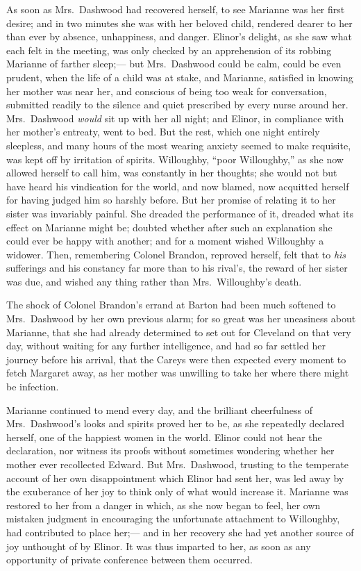 As soon as Mrs.\ Dashwood had recovered herself,
to see Marianne was her first desire; and in two minutes she
was with her beloved child, rendered dearer to her than ever
by absence, unhappiness, and danger.  Elinor's delight,
as she saw what each felt in the meeting, was only checked
by an apprehension of its robbing Marianne of farther sleep;---%
but Mrs.\ Dashwood could be calm, could be even prudent,
when the life of a child was at stake, and Marianne,
satisfied in knowing her mother was near her, and conscious
of being too weak for conversation, submitted readily to the
silence and quiet prescribed by every nurse around her.
Mrs.\ Dashwood \emph{would} sit up with her all night; and Elinor,
in compliance with her mother's entreaty, went to bed.
But the rest, which one night entirely sleepless,
and many hours of the most wearing anxiety seemed to
make requisite, was kept off by irritation of spirits.
Willoughby, ``poor Willoughby,'' as she now allowed
herself to call him, was constantly in her thoughts; she
would not but have heard his vindication for the world,
and now blamed, now acquitted herself for having judged him
so harshly before.  But her promise of relating it to her
sister was invariably painful.  She dreaded the performance
of it, dreaded what its effect on Marianne might be;
doubted whether after such an explanation she could ever
be happy with another; and for a moment wished Willoughby
a widower.  Then, remembering Colonel Brandon, reproved herself,
felt that to \emph{his} sufferings and his constancy far more
than to his rival's, the reward of her sister was due,
and wished any thing rather than Mrs.\ Willoughby's death.

The shock of Colonel Brandon's errand at Barton had been
much softened to Mrs.\ Dashwood by her own previous alarm;
for so great was her uneasiness about Marianne, that she
had already determined to set out for Cleveland on that
very day, without waiting for any further intelligence,
and had so far settled her journey before his arrival,
that the Careys were then expected every moment to fetch
Margaret away, as her mother was unwilling to take her
where there might be infection.

Marianne continued to mend every day, and the brilliant
cheerfulness of Mrs.\ Dashwood's looks and spirits proved
her to be, as she repeatedly declared herself, one of
the happiest women in the world.  Elinor could not hear
the declaration, nor witness its proofs without sometimes
wondering whether her mother ever recollected Edward.
But Mrs.\ Dashwood, trusting to the temperate account
of her own disappointment which Elinor had sent her,
was led away by the exuberance of her joy to think only
of what would increase it.  Marianne was restored to her
from a danger in which, as she now began to feel,
her own mistaken judgment in encouraging the unfortunate
attachment to Willoughby, had contributed to place her;---%
and in her recovery she had yet another source of joy
unthought of by Elinor.  It was thus imparted to her,
as soon as any opportunity of private conference
between them occurred.

